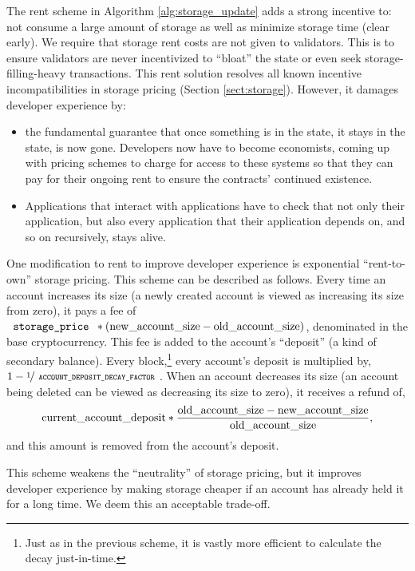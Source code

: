 \documentclass[12pt, final]{article}
\newcommand{\tt}[1]{{\texttt{ #1 }}}
\begin{document}
The rent scheme in Algorithm \ref{alg:storage_update} adds a strong incentive to: not consume a large amount of storage as well as minimize storage time (clear early).  We require that storage rent costs are not given to validators.  This is to ensure validators are never incentivized to ``bloat'' the state or even seek storage-filling-heavy transactions.  This rent solution resolves all known incentive incompatibilities in storage pricing (Section \ref{sect:storage}). However, it damages developer experience by:

\begin{itemize}
\item the fundamental guarantee that once something is in the state, it stays in the state, is now gone.  Developers now have to become economists, coming up with pricing schemes to charge for access to these systems so that they can pay for their ongoing rent to ensure the contracts' continued existence. 

\item Applications that interact with applications have to check that not only their application, but also every application that their application depends on, and so on recursively, stays alive.
\end{itemize}


One modification to rent to improve developer experience is exponential ``rent-to-own'' storage pricing.  This scheme can be described as follows. Every time an account increases its size (a newly created account is viewed as increasing its size from zero), it pays a fee of ${\tt{storage\_price}} * (\textnormal{new\_account\_size} - \textnormal{old\_account\_size})$, denominated in the base cryptocurrency. This fee is added to the account's ``deposit'' (a kind of secondary balance). Every block,\footnote{Just as in the previous scheme, it is vastly more efficient to calculate the decay just-in-time.} every account's deposit is multiplied by, $1 - \nicefrac{1}{\tt{ACCOUNT\_DEPOSIT\_DECAY\_FACTOR}}$.  When an account decreases its size (an account being deleted can be viewed as decreasing its size to zero), it receives a refund of,
\begin{equation}
\textnormal{current\_account\_deposit} * \frac{\textnormal{old\_account\_size} - \textnormal{new\_account\_size}}{\textnormal{old\_account\_size}},
\end{equation}
 and this amount is removed from the account's deposit.
 
This scheme weakens the ``neutrality'' of storage pricing, but it improves developer experience by making storage cheaper if an account has already held it for a long time.  We deem this an acceptable trade-off.  
\end{document}
